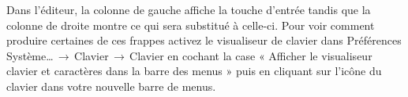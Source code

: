\documentclass[11pt,french]{article}
\newcommand{\mnu}[1]{\textsf{#1}}
\newcommand{\To}{\,\(\to\)\,}
\begin{document}
Dans l'éditeur, la colonne de gauche affiche la touche d'entrée tandis que la colonne de droite montre ce qui sera substitué à celle-ci. Pour voir comment produire certaines de ces frappes activez le visualiseur de clavier dans \mnu{Préférences Système…}\To\mnu{Clavier}\To\mnu{Clavier} en cochant la case « \mnu{Afficher le visualiseur clavier et caractères dans la barre des menus} » puis en cliquant sur l'icône du clavier dans votre nouvelle barre de menus.


\begin{figure}
\begin{floatrow}
%
\end{floatrow}
\end{figure}
\end{document}
